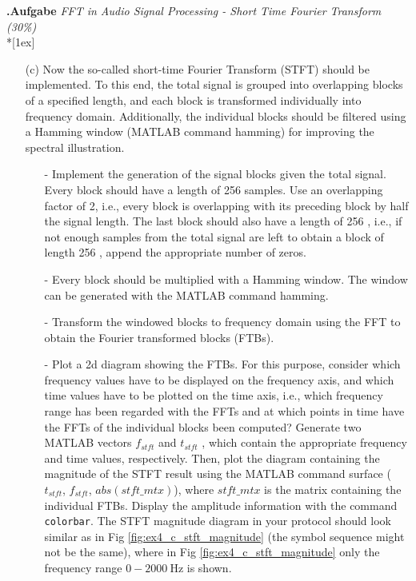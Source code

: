 \documentclass[12pt,a4paper,austrian]{article}
\newcounter{theaufgabe}\setcounter{theaufgabe}{1}
\newenvironment{aufgabe}[1]%
{\bigskip\par\noindent\begin{nopagebreak}
                          \textsf{\textbf{\arabic{theaufgabe}.\thinspace Aufgabe}}\quad
                          \textsf{\textit{#1}}\\*[1ex]%
                          \stepcounter{theaufgabe}\hspace{2ex}
\end{nopagebreak}}
{\par\pagebreak[2]}
\begin{document}
\begin{aufgabe}{FFT in Audio Signal Processing - Short Time Fourier Transform (30\%)}
\begin{enumerate}
            \item[(c)] Now the so-called short-time Fourier Transform (STFT) should be implemented.
            To this end, the total signal is grouped into overlapping blocks of a specified length, and each block is transformed individually into frequency domain.
            Additionally, the individual blocks should be filtered using a Hamming window (MATLAB command hamming) for improving the spectral illustration.
            \begin{enumerate}
                \item[-] Implement the generation of the signal blocks given the total signal.
                Every block should have a length of 256 samples.
                Use an overlapping factor of 2, i.e., every block is overlapping with its preceding block by half the signal length.
                The last block should also have a length of 256 , i.e., if not enough samples from the total signal are left to obtain a block of length 256 , append the appropriate number of zeros.
                \item[-] Every block should be multiplied with a Hamming window.
                The window can be generated with the MATLAB command hamming.
                \item[-] Transform the windowed blocks to frequency domain using the FFT to obtain the Fourier transformed blocks (FTBs).
                \item[-] Plot a 2d diagram showing the FTBs. For this purpose, consider which frequency values have to be displayed on the frequency axis, and which time values have to be plotted on the time axis, i.e., which frequency range has been regarded with the FFTs and at which points in time have the FFTs of the individual blocks been computed?
                Generate two MATLAB vectors $f_{stft}$ and $t_{stft}$ , which contain the appropriate frequency and time values, respectively.
                Then, plot the diagram containing the magnitude of the STFT result using the MATLAB command surface ( $t_{stft}$, $f_{stft}$, $abs(stft\_mtx)$), where $stft\_mtx$ is the matrix containing the individual FTBs. Display the amplitude information with the command \texttt{colorbar}.
                The STFT magnitude diagram in your protocol should look similar as in Fig \ref{fig:ex4_c_stft_magnitude} (the symbol sequence might not be the same), where in Fig \ref{fig:ex4_c_stft_magnitude} only the frequency range $0 - 2000 \mathrm{~Hz}$ is shown.


\end{enumerate}
\end{enumerate}
\end{aufgabe}
\end{document}
